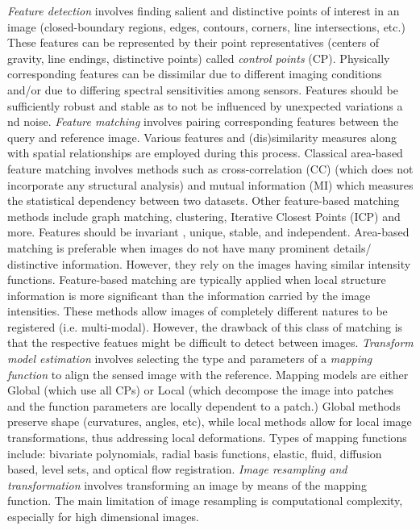 \documentclass[]{article}
\begin{document}
		\textit{Feature detection} involves finding salient and distinctive points of interest in an image (closed-boundary regions, edges, contours, corners, line intersections, etc.)  These features can be represented by their point representatives (centers of gravity, line endings, distinctive points) called \textit{control points} (CP).  Physically corresponding features can be dissimilar due to different imaging conditions and/or due to differing spectral sensitivities among sensors.  Features should be sufficiently robust and stable as to not be influenced by unexpected variations a nd noise. \textit{Feature  matching} involves pairing corresponding features  between the query and reference image.  Various features and (dis)similarity measures along with spatial relationships are employed during this process.  Classical area-based feature matching involves methods such as cross-correlation (CC) (which does not incorporate any structural analysis) and mutual information (MI) which measures the statistical dependency between two datasets.  Other feature-based matching methods include graph matching, clustering, Iterative Closest Points (ICP) and more.  Features should be invariant , unique, stable, and independent.  Area-based matching is preferable when images do not have many prominent details/ distinctive information.  However, they rely on the images having similar intensity functions.  Feature-based matching are typically applied when local structure information is more significant than the information carried by the image intensities.  These methods allow images of completely different natures to be registered (i.e. multi-modal).  However, the drawback of this class of matching is that the respective featues might be difficult to detect between images.   \textit{Transform model estimation} involves selecting the type and parameters of a \textit{mapping function} to align the sensed image with the reference. Mapping  models are either Global (which use all CPs) or Local (which decompose the image into patches and the function parameters are locally dependent to a patch.)  Global methods preserve shape (curvatures, angles, etc), while local methods allow for local image transformations, thus addressing local deformations.  Types of mapping functions include: bivariate polynomials, radial basis functions, elastic, fluid, diffusion based, level sets, and optical flow registration.  \textit{Image resampling and transformation} involves transforming an image by means of the mapping function.  The main limitation of image resampling is computational complexity, especially for high dimensional images. \\
\end{document}
